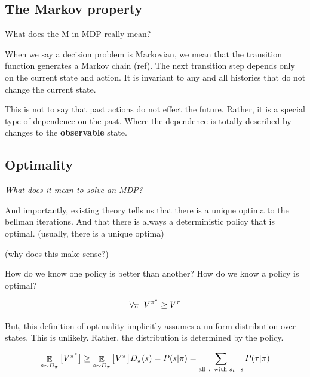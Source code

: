 \hypertarget{the-markov-property}{%
\subsection{The Markov property}\label{the-markov-property}}

\begin{displayquote}
  What does the M in MDP really mean?
\end{displayquote}

When we say a decision problem is Markovian, we mean that the transition
function generates a Markov chain (ref). The next transition step depends only
on the current state and action. It is invariant to any and all histories that do not
change the current state.

This is not to say that past actions do not effect the future. Rather,
it is a special type of dependence on the past. Where the dependence is
totally described by changes to the \textbf{observable} state.


\hypertarget{optimality}{%
\subsection{Optimality}\label{optimality}}

\begin{displayquote}
  \textit{What does it mean to solve an MDP?}
\end{displayquote}

And importantly, existing theory tells us that there is a unique optima to the bellman iterations.
And that there is always a deterministic policy that is optimal. (usually, there is a unique optima)

(why does this make sense?)


How do we know one policy is better than another? How do we know a
policy is optimal?

\[
\forall \pi\;\; V^{\pi^* } \ge V^{\pi} \\
\]

But, this definition of optimality implicitly assumes a uniform
distribution over states. This is unlikely. Rather, the distribution is
determined by the policy.

\[
\mathop{{\mathbb E}}_{s\sim D_{\pi}} \big[ V^{\pi^* } \big] \ge \mathop{{\mathbb E}}_{s\sim D_{\pi}} \big[ V^{\pi} \big] \\
D_{\pi}(s) = P(s | \pi) = \sum_{\text{all } \tau \text{ with } s_t = s} P(\tau | \pi)
\]

